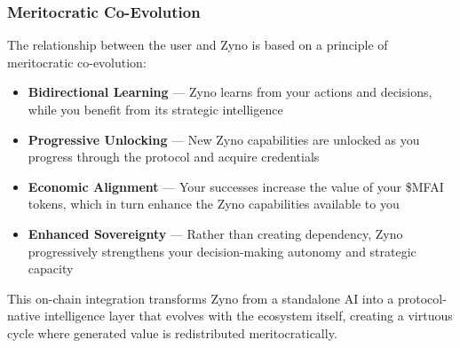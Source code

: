 \subsubsection*{Meritocratic Co-Evolution}

The relationship between the user and Zyno is based on a principle of meritocratic co-evolution:

\begin{itemize}
    \item \textbf{Bidirectional Learning} — Zyno learns from your actions and decisions, while you benefit from its strategic intelligence
    
    \item \textbf{Progressive Unlocking} — New Zyno capabilities are unlocked as you progress through the protocol and acquire  credentials
    
    \item \textbf{Economic Alignment} — Your successes increase the value of your \$MFAI tokens, which in turn enhance the Zyno capabilities available to you
    
    \item \textbf{Enhanced Sovereignty} — Rather than creating dependency, Zyno progressively strengthens your decision-making autonomy and strategic capacity
\end{itemize}

This on-chain integration transforms Zyno from a standalone AI into a protocol-native intelligence layer that evolves with the ecosystem itself, creating a virtuous cycle where generated value is redistributed meritocratically.

